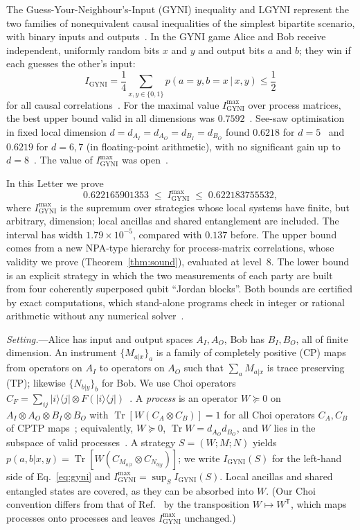 \documentclass[aps,prl,twocolumn,superscriptaddress,longbibliography,nofootinbib]{revtex4-2}
\newcommand{\Tr}{\operatorname{Tr}}
\newcommand{\ket}[1]{\lvert #1\rangle}
\newcommand{\bra}[1]{\langle #1\rvert}
\newcommand{\tp}{\mathsf{T}}
\newcommand{\Igy}{I_{\mathrm{GYNI}}}
\newcommand{\Imax}{I_{\mathrm{GYNI}}^{\max}}
\begin{document}
The Guess-Your-Neighbour's-Input (GYNI) inequality and LGYNI represent the two families of nonequivalent causal inequalities of the simplest bipartite scenario, with binary inputs and outputs~\cite{Branciard2016}. In the GYNI game Alice and Bob receive independent, uniformly random bits $x$ and $y$ and output bits $a$ and $b$; they win if each guesses the other's input:
\begin{equation}
\Igy=\frac14\sum_{x,y\in\{0,1\}}p(a=y,b=x\,|\,x,y)\le\frac12
\label{eq:gyni}
\end{equation}
for all causal correlations~\cite{Branciard2016}. For the maximal value $\Imax$ over process matrices, the best upper bound valid in all dimensions was $0.7592$~\cite{LiuChiribella2025}. See-saw optimisation in fixed local dimension $d=d_{A_I}=d_{A_O}=d_{B_I}=d_{B_O}$ found $0.6218$ for $d=5$~\cite{Branciard2016} and $0.6219$ for $d=6,7$ (in floating-point arithmetic), with no significant gain up to $d=8$~\cite{BoghiuSimonov2026}. The value of $\Imax$ was open~\cite{Branciard2016,LiuChiribella2025,BoghiuSimonov2026}.

In this Letter we prove
\begin{equation}
0.622165901353\;\le\;\Imax\;\le\;0.622183755532 ,
\label{eq:main}
\end{equation}
where $\Imax$ is the supremum over strategies whose local systems have finite, but arbitrary, dimension; local ancillas and shared entanglement are included. The interval has width $1.79\times10^{-5}$, compared with $0.137$ before. The upper bound comes from a new NPA-type hierarchy for process-matrix correlations, whose validity we prove (Theorem~\ref{thm:sound}), evaluated at level~8. The lower bound is an explicit strategy in which the two measurements of each party are built from four coherently superposed qubit ``Jordan blocks''. Both bounds are certified by exact computations, which stand-alone programs check in integer or rational arithmetic without any numerical solver~\cite{repo}.

\emph{Setting.}---Alice has input and output spaces $A_I,A_O$, Bob has $B_I,B_O$, all of finite dimension. An instrument $\{M_{a|x}\}_a$ is a family of completely positive (CP) maps from operators on $A_I$ to operators on $A_O$ such that $\sum_aM_{a|x}$ is trace preserving (TP); likewise $\{N_{b|y}\}_b$ for Bob. We use Choi operators $C_F=\sum_{ij}\ket{i}\bra{j}\otimes F(\ket{i}\bra{j})$~\cite{Choi1975}. A \emph{process} is an operator $W\succeq0$ on $A_I\otimes A_O\otimes B_I\otimes B_O$ with $\Tr[W(C_A\otimes C_B)]=1$ for all Choi operators $C_A,C_B$ of CPTP maps~\cite{Oreshkov2012,Araujo2015}; equivalently, $W\succeq0$, $\Tr W=d_{A_O}d_{B_O}$, and $W$ lies in the subspace of valid processes~\cite{Araujo2015}. A strategy $S=(W;M;N)$ yields $p(a,b|x,y)=\Tr[W(C_{M_{a|x}}\otimes C_{N_{b|y}})]$; we write $\Igy(S)$ for the left-hand side of Eq.~\eqref{eq:gyni} and $\Imax=\sup_S\Igy(S)$. Local ancillas and shared entangled states are covered, as they can be absorbed into $W$. (Our Choi convention differs from that of Ref.~\cite{Oreshkov2012} by the transposition $W\mapsto W^\tp$, which maps processes onto processes and leaves $\Imax$ unchanged.)
\end{document}
